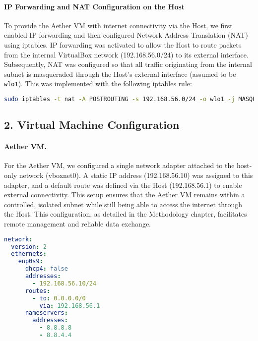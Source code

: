 \paragraph{IP Forwarding and NAT Configuration on the Host} 
To provide the Aether VM with internet connectivity via the Host, we first enabled IP forwarding and then configured Network Address Translation (NAT) using iptables. IP forwarding was activated to allow the Host to route packets from the internal VirtualBox network (192.168.56.0/24) to its external interface. 
Subsequently, NAT was configured so that all traffic originating from the internal subnet is masqueraded through the Host’s external interface (assumed to be \texttt{wlo1}). This was implemented with the following iptables rule:
\begin{lstlisting}[language=bash]
sudo iptables -t nat -A POSTROUTING -s 192.168.56.0/24 -o wlo1 -j MASQUERADE
\end{lstlisting}

\subsection*{2. Virtual Machine Configuration}

\paragraph{Aether VM.}
For the Aether VM, we configured a single network adapter attached to the host-only network (vboxnet0). A static IP address (192.168.56.10) was assigned to this adapter, and a default route was defined via the Host (192.168.56.1) to enable external connectivity. This setup ensures that the Aether VM remains within a controlled, isolated subnet while still being able to access the internet through the Host. This configuration, as detailed in the Methodology chapter, facilitates remote management and reliable data exchange.

\begin{lstlisting}[language=yaml, caption={Netplan configuration applied to the Aether VM for static routing and DNS setup}]
network:
  version: 2
  ethernets:
    enp0s9:
      dhcp4: false
      addresses:
        - 192.168.56.10/24
      routes:
        - to: 0.0.0.0/0
          via: 192.168.56.1
      nameservers:
        addresses:
          - 8.8.8.8
          - 8.8.4.4
\end{lstlisting}


